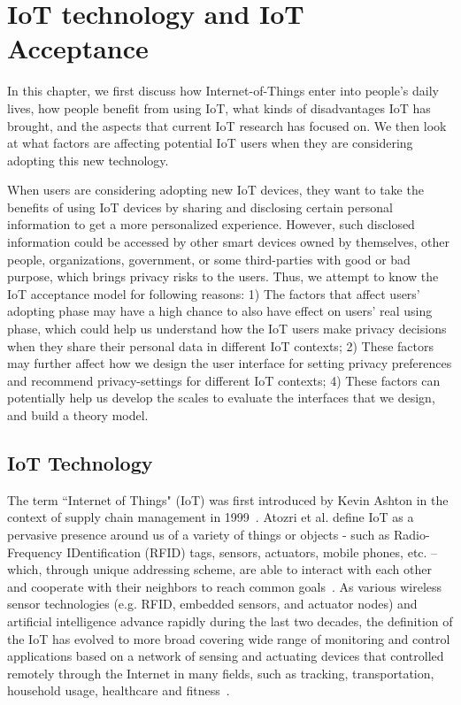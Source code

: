 \chapter{IoT technology and IoT Acceptance}\label{chapter:Relatedwork1}
In this chapter, we first discuss how Internet-of-Things enter into people's daily lives, how people benefit from using IoT, what kinds of disadvantages IoT has brought, and the aspects that current IoT research has focused on. We then look at what factors are affecting potential IoT users when they are considering adopting this new technology.

When users are considering adopting new IoT devices, they want to take the benefits of using IoT devices by sharing and disclosing certain personal information to get a more personalized experience. However, such disclosed information could be accessed by other smart devices owned by themselves, other people, organizations, government, or some third-parties with good or bad purpose, which brings privacy risks to the users. Thus, we attempt to know the IoT acceptance model for following reasons: 1) The factors that affect users' adopting phase may have a high chance to also have effect on users' real using phase, which could help us understand how the IoT users make privacy decisions when they share their personal data in different IoT contexts; 2) These factors may further affect how we design the user interface for setting privacy preferences and recommend privacy-settings for different IoT contexts; 4) These factors can potentially help us develop the scales to evaluate the interfaces that we design, and build a theory model.

\section{IoT Technology}
The term ``Internet of Things" (IoT) was first introduced by Kevin Ashton in the context of supply chain management in 1999~\cite{ashton2009internet}. Atozri et al. define IoT as a pervasive presence around us of a variety of things or objects - such as Radio-Frequency IDentification (RFID) tags, sensors, actuators, mobile phones, etc. -- which, through unique addressing scheme, are able to interact with each other and cooperate with their neighbors to reach common goals~\cite{atzori2010internet}. As various wireless sensor technologies (e.g. RFID, embedded sensors, and actuator nodes) and artificial intelligence advance rapidly during the last two decades, the definition of the IoT has evolved to more broad covering wide range of monitoring and control applications based on a network of sensing and actuating devices that controlled remotely through the Internet in many fields, such as tracking, transportation, household usage, healthcare and fitness~\cite{li2011smart, solima2016object, kelly2013towards, jia2012rfid, hassanalieragh2015health}.

